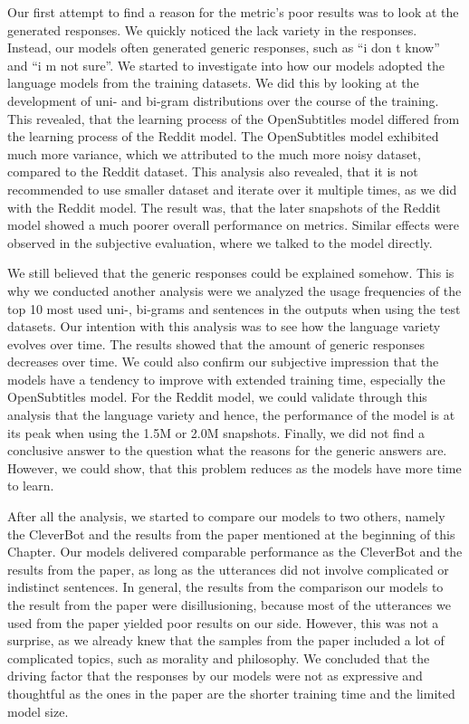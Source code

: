 Our first attempt to find a reason for the metric's poor results was to look at the generated responses. We quickly noticed the lack variety in the responses. Instead, our models often generated generic responses, such as ``i don t know'' and ``i m not sure''. We started to investigate into how our models adopted the language models from the training datasets. We did this by looking at the development of uni- and bi-gram distributions over the course of the training. This revealed, that the learning process of the OpenSubtitles model differed from the learning process of the Reddit model. The OpenSubtitles model exhibited much more variance, which we attributed to the much more noisy dataset, compared to the Reddit dataset. This analysis also revealed, that it is not recommended to use smaller dataset and iterate over it multiple times, as we did with the Reddit model. The result was, that the later snapshots of the Reddit model showed a much poorer overall performance on metrics. Similar effects were observed in the subjective evaluation, where we talked to the model directly.

We still believed that the generic responses could be explained somehow. This is why we conducted another analysis were we analyzed the usage frequencies of the top 10 most used uni-, bi-grams and sentences in the outputs when using the test datasets. Our intention with this analysis was to see how the language variety evolves over time. The results showed that the amount of generic responses decreases over time. We could also confirm our subjective impression that the models have a tendency to improve with extended training time, especially the OpenSubtitles model. For the Reddit model, we could validate through this analysis that the language variety and hence, the performance of the model is at its peak when using the 1.5M or 2.0M snapshots. Finally, we did not find a conclusive answer to the question what the reasons for the generic answers are. However, we could show, that this problem reduces as the models have more time to learn.

After all the analysis, we started to compare our models to two others, namely the CleverBot and the results from the paper mentioned at the beginning of this Chapter. Our models delivered comparable performance as the CleverBot and the results from the paper, as long as the utterances did not involve complicated or indistinct sentences. In general, the results from the comparison our models to the result from the paper were disillusioning, because most of the utterances we used from the paper yielded poor results on our side. However, this was not a surprise, as we already knew that the samples from the paper included a lot of complicated topics, such as morality and philosophy. We concluded that the driving factor that the responses by our models were not as expressive and thoughtful as the ones in the paper are the shorter training time and the limited model size.

